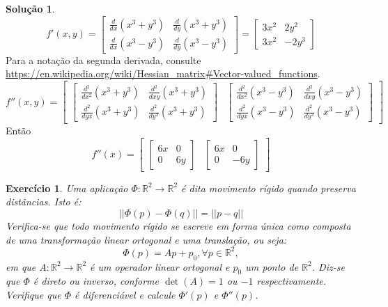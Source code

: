 \documentclass[a4paper,12pt]{article}
\newcommand{\R}{\mathbb{R}}
\theoremstyle{exer}
\newtheorem{exercise}{Exercício}
\theoremstyle{definition}
\newtheorem{solution}{Solução}
\theoremstyle{plain}
\begin{document}
\begin{solution}
    $$
    f'(x,y) =  \begin{bmatrix}
        \frac{d}{dx}(x^3 + y^3) & \frac{d}{dy}(x^3 + y^3) \\
        \frac{d}{dx}(x^3 - y^3) & \frac{d}{dy}(x^3 - y^3) 
    \end{bmatrix} = \begin{bmatrix}
        3x^2 & 2y^2 \\
        3x^2 & -2y^3 
    \end{bmatrix} 
    $$
    Para a notação da segunda derivada, consulte \url{https://en.wikipedia.org/wiki/Hessian_matrix#Vector-valued_functions}.
    $$
    f''(x,y) = \begin{bmatrix}
        \begin{bmatrix}
            \frac{d^2}{dx^2}(x^3 + y^3) & \frac{d^2}{dxy}(x^3 + y^3) \\
            \frac{d^2}{dyx}(x^3 + y^3) & \frac{d^2}{dy^2}(x^3 + y^3)
        \end{bmatrix} & 
        \begin{bmatrix}
            \frac{d^2}{dx^2}(x^3 - y^3) & \frac{d^2}{dxy}(x^3 - y^3) \\
            \frac{d^2}{dyx}(x^3 - y^3) & \frac{d^2}{dy^2}(x^3 - y^3)
        \end{bmatrix}
    \end{bmatrix}
    $$
    Então 
    $$
    f''(x) = \begin{bmatrix}
        \begin{bmatrix}
            6x & 0 \\
            0 & 6y
        \end{bmatrix} & 
        \begin{bmatrix}
            6x & 0 \\
            0 & -6y
        \end{bmatrix}
    \end{bmatrix} 
    $$

\end{solution}

\begin{exercise}
    Uma aplicação $\Phi : \R^2 \to \R^2$ é dita {\it movimento rígido} quando
    preserva distâncias. Isto é: 
    $$
    ||\Phi(p) - \Phi(q)|| = ||p - q||
    $$
    Verifica-se que todo movimento rígido se escreve em forma única como
    composta de uma transformação linear ortogonal e uma translação, ou seja:
    $$
    \Phi(p) = Ap + p_0, \forall p \in \R^2,
    $$
    em que $A : \R^2 \to \R^2$  é um operador linear ortogonal e  $p_0$ um
    ponto de $\R^2$. Diz-se que $\Phi$ é {\it direto} ou {\it inverso},
    conforme $\det(A) = 1$ ou $-1$ respectivamente. Verifique que $\Phi$ é
    diferenciável e calcule $\Phi '(p)$ e $\Phi ''(p)$.
\end{exercise}
\end{document}
